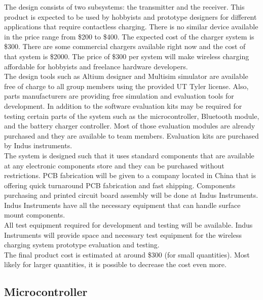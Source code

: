 \documentclass[12pt]{article}
\begin{document}
\indent \indent
The design consists of two subsystems: the transmitter and the receiver. This product is expected to be used by hobbyists and prototype designers for different applications that require contactless charging. There is no similar device available in the price range from \$200 to \$400.  The expected cost of the charger system is \$300. There are some commercial chargers available right now and the cost of that system is \$2000. The price of \$300 per system will make wireless charging affordable for hobbyists and freelance hardware developers.\\

\indent
The design tools such as Altium designer and Multisim simulator are available free of charge to all group members using the provided UT Tyler license. Also, parts manufacturers are providing free simulation and evaluation tools for development. In addition to the software evaluation kits may be required for testing certain parts of the system such as the microcontroller, Bluetooth module, and the battery charger controller. Most of those evaluation modules are already purchased and they are available to team members. Evaluation kits are purchased by Indus instruments.\\

\indent
The system is designed such that it uses standard components that are available at any electronic components store and they can be purchased without restrictions. PCB fabrication will be given to a company located in China that is offering quick turnaround PCB fabrication and fast shipping. Components purchasing and printed circuit board assembly will be done at Indus Instruments. Indus Instruments have all the necessary equipment that can handle surface mount components.\\

\indent
All test equipment required for development and testing will be available. Indus Instruments will provide space and necessary test equipment for the wireless charging system prototype evaluation and testing.\\

\indent
The final product cost is estimated at around \$300 (for small quantities). Most likely for larger quantities, it is possible to decrease the cost even more. 

\subsection{Microcontroller}
\end{document}
